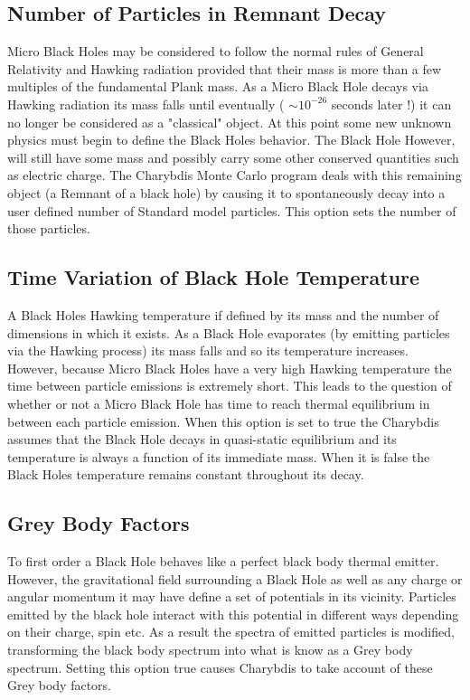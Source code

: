 \documentclass[11pt]{article}
\begin{document}
\subsection*{Number of Particles in Remnant Decay}

Micro Black Holes may be considered to follow the normal rules of
General Relativity and Hawking radiation provided that their mass is
more than a few multiples of the fundamental Plank mass. As a Micro
Black Hole decays via Hawking radiation its mass falls until
eventually ( $\sim 10^{-26}$ seconds later !) it can no longer be considered
as a "classical" object. At this point some new unknown physics must
begin to define the Black Holes behavior. The Black Hole However, will
still have some mass and possibly carry some other conserved
quantities such as electric charge. The Charybdis Monte Carlo program
deals with this remaining object (a Remnant of a black hole) by
causing it to spontaneously decay into a user defined number of
Standard model particles. This option sets the number of those particles.

\subsection*{Time Variation of Black Hole Temperature}

A Black Holes Hawking temperature if defined by its mass and the
number of dimensions in which it exists. As a Black Hole evaporates
(by emitting particles via the Hawking process) its mass falls and so
its temperature increases. However, because Micro Black Holes have a
very high Hawking temperature the time between particle emissions is
extremely short. This leads to the question of whether or not a Micro
Black Hole has time to reach thermal equilibrium in between each
particle emission. When this option is set to true the Charybdis
assumes that the Black Hole decays in quasi-static equilibrium and
its temperature is always a function of its immediate mass. When it is
false the Black Holes temperature remains constant throughout its decay.

\subsection*{Grey Body Factors}

To first order a Black Hole behaves like a perfect black body thermal
emitter. However, the gravitational field surrounding a Black Hole as
well as any charge or angular momentum it may have define a set of
potentials in its vicinity. Particles emitted by the black hole
interact with this potential in different ways depending on their
charge, spin etc. As a result the spectra of emitted particles is
modified, transforming the black body spectrum into what is know as a
Grey body spectrum. Setting this option true causes Charybdis to take
account of these Grey body factors.
\end{document}
